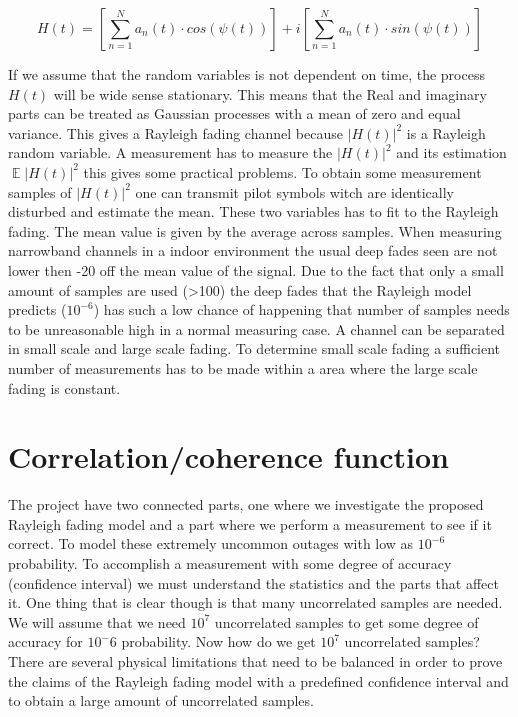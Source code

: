 \begin{equation}
H(t) = \left [ \sum_{n =1}^{N} a_n(t)\cdot cos(\psi (t))\right ] + i\left [\sum_{n =1}^{N} a_n(t)\cdot sin(\psi (t))  \right ]
\end{equation}

If we assume that the random variables is not dependent on time, the process $H(t)$ will be wide sense stationary. This means that the Real and imaginary parts can be treated as Gaussian processes with a mean of zero and equal variance. This gives a Rayleigh fading channel because $ \left | H(t) \right |^2 $ is a Rayleigh random variable.
A measurement has to measure the $ \left | H(t) \right |^2 $ and its estimation $ \mathop{\mathbb{E}}\left | H(t) \right |^2 $ this gives some practical problems. To obtain some measurement samples of $ \left | H(t) \right |^2 $ one can transmit pilot symbols witch are identically disturbed and estimate the mean.\citep{MeasurementComplexRay}
These two variables has to fit to the Rayleigh fading. The mean value is given by the average across samples.
When measuring narrowband channels in a indoor environment the usual deep fades seen are not lower then -20 off the mean value of the signal. Due to the fact that only a small amount of samples are used (>100) the deep fades that the Rayleigh model predicts ($10^{-6}$) has such a low chance of happening that number of samples needs to be unreasonable high in a normal measuring case.
A  channel can be separated in  small scale and large scale fading. To determine small scale fading a sufficient number of measurements has to be made within a area where the large scale fading is constant.



\section{Correlation/coherence function}
The project have two connected parts, one where we investigate the proposed Rayleigh fading model and a part where we perform a measurement to see if it correct.  To model these extremely uncommon outages with low as $10^{-6}$ probability. To accomplish a measurement with some degree of accuracy (confidence interval) we must understand the statistics and the parts that affect it. One thing that is clear though is that many uncorrelated samples are needed. We will assume that we need $10^7$ uncorrelated samples to get some degree of accuracy for $10^-6$ probability. Now how do we get $10^7$ uncorrelated samples?
There are several physical limitations that need to be balanced  in order to prove the claims of the Rayleigh fading model with a predefined confidence interval and to obtain a large amount of uncorrelated samples.

